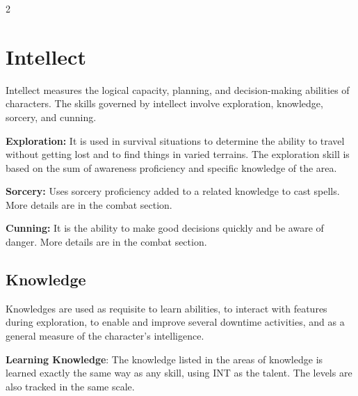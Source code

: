 \begin{multicols}{2}





\section{Intellect}

Intellect measures the logical capacity, planning, and decision-making abilities of characters. The skills governed by intellect involve exploration, knowledge, sorcery, and cunning.

\textbf{Exploration:} It is used in survival situations to determine the ability to travel without getting lost and to find things in varied terrains. The exploration skill is based on the sum of awareness proficiency and specific knowledge of the area.

\textbf{Sorcery:} Uses sorcery proficiency added to a related knowledge to cast spells. More details are in the combat section.

\textbf{Cunning:} It is the ability to make good decisions quickly and be aware of danger. More details are in the combat section.


\subsection{Knowledge}

Knowledges are used as requisite to learn abilities, to interact with features during exploration, to enable and improve several downtime activities, and as a general measure of the character's intelligence.

\textbf{Learning Knowledge}: The knowledge listed in the areas of knowledge is learned exactly the same way as any skill, using INT as the talent. The levels are also tracked in the same scale.


\end{multicols}
